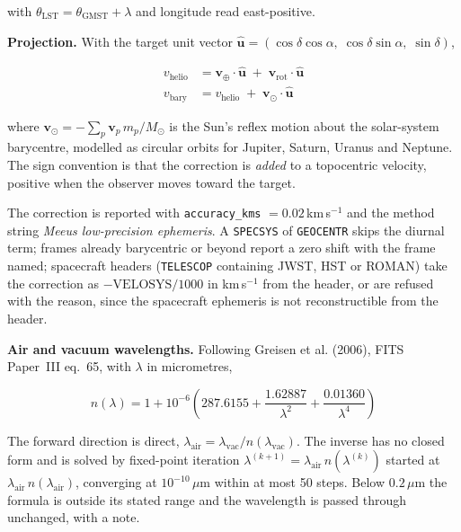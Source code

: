 \documentclass[11pt,a4paper]{article}
\newcommand{\code}[1]{\texttt{\small #1}}
\begin{document}
    with $\theta_{\text{LST}} = \theta_{\text{GMST}} + \lambda$ and longitude read east-positive.

    \textbf{Projection.} With the target unit vector $\hat{\mathbf{u}} = (\cos\delta\cos\alpha,\; \cos\delta\sin\alpha,\; \sin\delta)$,

    \begin{align}
        v_{\text{helio}} &= \mathbf{v}_{\oplus} \cdot \hat{\mathbf{u}} \;+\; \mathbf{v}_{\text{rot}} \cdot \hat{\mathbf{u}} \\[4pt]
        v_{\text{bary}} &= v_{\text{helio}} \;+\; \mathbf{v}_{\odot} \cdot \hat{\mathbf{u}}
    \end{align}

    where $\mathbf{v}_{\odot} = -\sum_p \mathbf{v}_p \, m_p / M_{\odot}$ is the Sun's reflex motion about the solar-system barycentre, modelled as circular orbits for Jupiter, Saturn, Uranus and Neptune. The sign convention is that the correction is \emph{added} to a topocentric velocity, positive when the observer moves toward the target.

    \begin{notebox}
        The correction is reported with \code{accuracy\_kms} $= 0.02$\,km\,s$^{-1}$ and the method string \emph{Meeus low-precision ephemeris}. A \code{SPECSYS} of \code{GEOCENTR} skips the diurnal term; frames already barycentric or beyond report a zero shift with the frame named; spacecraft headers (\code{TELESCOP} containing JWST, HST or ROMAN) take the correction as $-\text{VELOSYS}/1000$ in km\,s$^{-1}$ from the header, or are refused with the reason, since the spacecraft ephemeris is not reconstructible from the header.
    \end{notebox}

    \textbf{Air and vacuum wavelengths.} Following Greisen et al. (2006), FITS Paper~III eq.~65, with $\lambda$ in micrometres,

    \begin{equation}
        \boxed{
            n(\lambda) = 1 + 10^{-6}\left(287.6155 + \frac{1.62887}{\lambda^2} + \frac{0.01360}{\lambda^4}\right)
        }
    \end{equation}

    The forward direction is direct, $\lambda_{\text{air}} = \lambda_{\text{vac}} / n(\lambda_{\text{vac}})$. The inverse has no closed form and is solved by fixed-point iteration $\lambda^{(k+1)} = \lambda_{\text{air}} \, n(\lambda^{(k)})$ started at $\lambda_{\text{air}} \, n(\lambda_{\text{air}})$, converging at $10^{-10}\,\mu$m within at most 50 steps. Below $0.2\,\mu$m the formula is outside its stated range and the wavelength is passed through unchanged, with a note.
\end{document}
